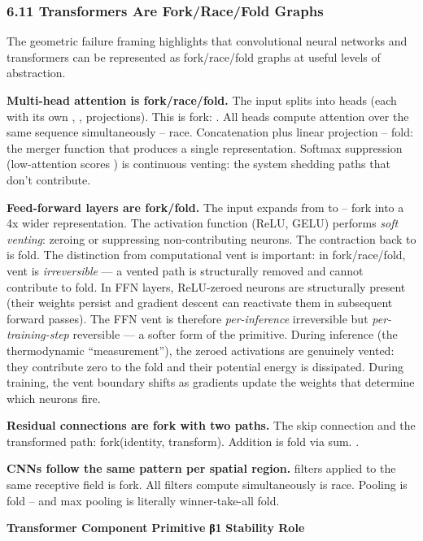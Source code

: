 \documentclass[
]{article}
\begin{document}
\subsubsection{\texorpdfstring{\textbf{6.11 Transformers Are
Fork/Race/Fold
Graphs}}{6.11 Transformers Are Fork/Race/Fold Graphs}}\label{transformers-are-forkracefold-graphs}

The geometric failure framing highlights that convolutional neural
networks and transformers can be represented as fork/race/fold graphs at
useful levels of abstraction.

\textbf{Multi-head attention is fork/race/fold.} The input splits into
heads (each with its own , , projections). This is fork: . All heads
compute attention over the same sequence simultaneously -- race.
Concatenation plus linear projection -- fold: the merger function that
produces a single representation. Softmax suppression (low-attention
scores ) is continuous venting: the system shedding paths that don't
contribute.

\textbf{Feed-forward layers are fork/fold.} The input expands from to --
fork into a 4x wider representation. The activation function (ReLU,
GELU) performs \emph{soft venting}: zeroing or suppressing
non-contributing neurons. The contraction back to is fold. The
distinction from computational vent is important: in fork/race/fold,
vent is \emph{irreversible} --- a vented path is structurally removed
and cannot contribute to fold. In FFN layers, ReLU-zeroed neurons are
structurally present (their weights persist and gradient descent can
reactivate them in subsequent forward passes). The FFN vent is therefore
\emph{per-inference} irreversible but \emph{per-training-step}
reversible --- a softer form of the primitive. During inference (the
thermodynamic ``measurement''), the zeroed activations are genuinely
vented: they contribute zero to the fold and their potential energy is
dissipated. During training, the vent boundary shifts as gradients
update the weights that determine which neurons fire.

\textbf{Residual connections are fork with two paths.} The skip
connection and the transformed path: fork(identity, transform). Addition
is fold via sum. .

\textbf{CNNs follow the same pattern per spatial region.} filters
applied to the same receptive field is fork. All filters compute
simultaneously is race. Pooling is fold -- and max pooling is literally
winner-take-all fold.

\textbf{Transformer Component} \textbar{} \textbf{Primitive} \textbar{}
\textbf{β1\hspace{0pt}} \textbar{} \textbf{Stability Role} \textbar{}
\end{document}
